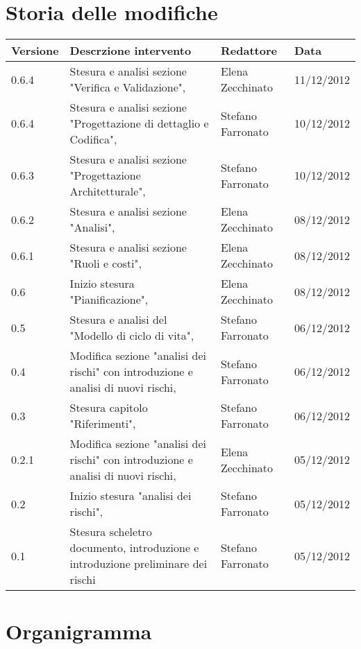 \section*{Storia delle modifiche}
\begin{tabularx}{\textwidth}{lXll}
\toprule
Versione & Descrzione intervento & Redattore & Data\\
\midrule %
0.6.4 &Stesura e analisi sezione "Verifica e Validazione", & Elena Zecchinato & 11/12/2012\\
0.6.4 &Stesura e analisi sezione "Progettazione di dettaglio e Codifica", & Stefano Farronato & 10/12/2012\\
0.6.3 &Stesura e analisi sezione "Progettazione Architetturale", & Stefano Farronato & 10/12/2012\\
0.6.2 &Stesura e analisi sezione "Analisi", & Elena Zecchinato & 08/12/2012\\
0.6.1 &Stesura e analisi sezione "Ruoli e costi", & Elena Zecchinato & 08/12/2012\\
0.6 &Inizio stesura "Pianificazione", & Elena Zecchinato & 08/12/2012\\
0.5 &Stesura e analisi del "Modello di ciclo di vita", & Stefano Farronato & 06/12/2012\\
0.4 &Modifica sezione "analisi dei rischi" con introduzione e analisi di nuovi rischi, & Stefano Farronato & 06/12/2012\\
0.3 & Stesura capitolo "Riferimenti", & Stefano Farronato & 06/12/2012\\
0.2.1 & Modifica sezione "analisi dei rischi" con introduzione e analisi di nuovi rischi, & Elena Zecchinato & 05/12/2012\\
0.2 & Inizio stesura "analisi dei rischi", & Stefano Farronato & 05/12/2012\\
0.1 & Stesura scheletro documento, introduzione e introduzione preliminare dei rischi & Stefano Farronato & 05/12/2012\\
\bottomrule
\end{tabularx}
\newpage



\setcounter{page}{1}
\pagestyle{normal}

\section{Organigramma}


